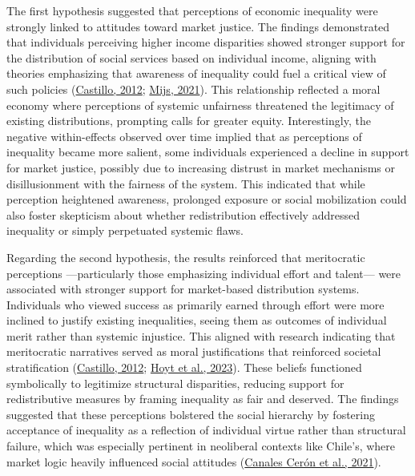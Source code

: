 \documentclass[
  12pt,
]{article}
\begin{document}
The first hypothesis suggested that perceptions of economic inequality
were strongly linked to attitudes toward market justice. The findings
demonstrated that individuals perceiving higher income disparities
showed stronger support for the distribution of social services based on
individual income, aligning with theories emphasizing that awareness of
inequality could fuel a critical view of such policies
(\protect\hyperlink{ref-Castillo2012a_justice}{Castillo, 2012};
\protect\hyperlink{ref-mijs_paradox_2021}{Mijs, 2021}). This
relationship reflected a moral economy where perceptions of systemic
unfairness threatened the legitimacy of existing distributions,
prompting calls for greater equity. Interestingly, the negative
within-effects observed over time implied that as perceptions of
inequality became more salient, some individuals experienced a decline
in support for market justice, possibly due to increasing distrust in
market mechanisms or disillusionment with the fairness of the system.
This indicated that while perception heightened awareness, prolonged
exposure or social mobilization could also foster skepticism about
whether redistribution effectively addressed inequality or simply
perpetuated systemic flaws.

Regarding the second hypothesis, the results reinforced that
meritocratic perceptions ---particularly those emphasizing individual
effort and talent--- were associated with stronger support for
market-based distribution systems. Individuals who viewed success as
primarily earned through effort were more inclined to justify existing
inequalities, seeing them as outcomes of individual merit rather than
systemic injustice. This aligned with research indicating that
meritocratic narratives served as moral justifications that reinforced
societal stratification
(\protect\hyperlink{ref-Castillo2012a_justice}{Castillo, 2012};
\protect\hyperlink{ref-hoyt_mindsets_2023}{Hoyt et al., 2023}). These
beliefs functioned symbolically to legitimize structural disparities,
reducing support for redistributive measures by framing inequality as
fair and deserved. The findings suggested that these perceptions
bolstered the social hierarchy by fostering acceptance of inequality as
a reflection of individual virtue rather than structural failure, which
was especially pertinent in neoliberal contexts like Chile's, where
market logic heavily influenced social attitudes
(\protect\hyperlink{ref-canalesceron_sujeto_2021}{Canales Cerón et al.,
2021}).
\end{document}
